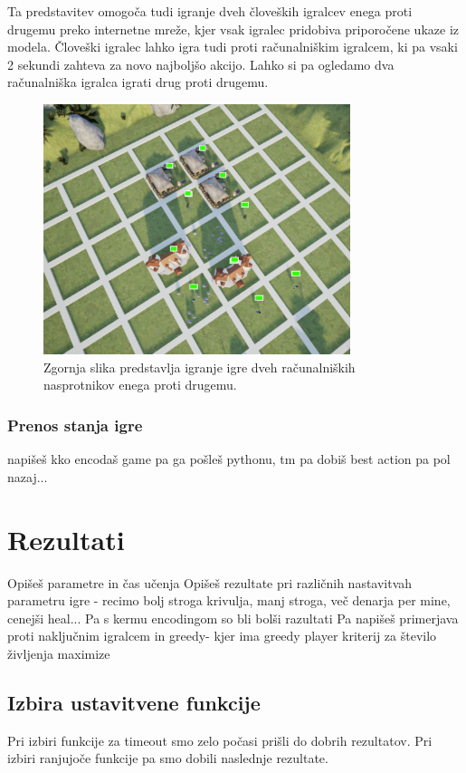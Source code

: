 \documentclass[a4paper, 12pt]{book}
\begin{document}
Ta predstavitev omogoča tudi igranje dveh človeških igralcev enega proti drugemu preko internetne mreže, kjer vsak igralec pridobiva priporočene ukaze iz modela.
Človeški igralec lahko igra tudi proti računalniškim igralcem, ki pa vsaki 2 sekundi zahteva za novo najboljšo akcijo.
Lahko si pa ogledamo dva računalniška igralca igrati drug proti drugemu.

\begin{figure}[h]
	\begin{center}
		\includegraphics[width=0.8\textwidth]{visualization_ue4.pdf}
	\end{center}
	\caption{Zgornja slika predstavlja igranje igre dveh računalniških nasprotnikov enega proti drugemu.}
	\label{visualization_ue4}
\end{figure}

\subsection{Prenos stanja igre}
napišeš kko encodaš game pa ga pošleš pythonu, tm pa dobiš best action pa pol nazaj...


\chapter{Rezultati}
\label{chrezultati}
Opišeš parametre in čas učenja
Opišeš rezultate pri različnih nastavitvah parametru igre - recimo bolj stroga krivulja, manj stroga, več denarja per mine, cenejši heal...
Pa s kermu encodingom so bli bolši razultati
Pa napišeš primerjava proti naključnim igralcem in greedy- kjer ima greedy player kriterij za število življenja maximize
\section{Izbira ustavitvene funkcije}
Pri izbiri funkcije za timeout smo zelo počasi prišli do dobrih rezultatov.
Pri izbiri ranjujoče funkcije pa smo dobili naslednje rezultate.
\end{document}
